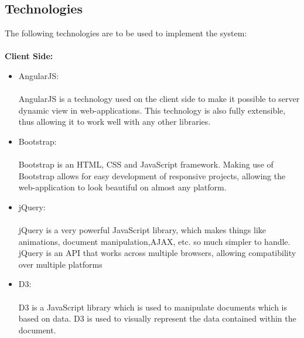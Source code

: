 \subsection{Technologies}
The following technologies are to be used to implement the system:\\ \\
{\bfseries Client Side:}
\begin{itemize}
	\item AngularJS: \\ \\
	AngularJS is a technology used on the client side to make it possible to server dynamic view in web-applications. This technology is also fully extensible, thus allowing it to work well with any other libraries.
	\item Bootstrap: \\ \\
	Bootstrap is an HTML, CSS and JavaScript framework. Making use of Bootstrap allows for easy development of responsive projects, allowing the web-application to look beautiful on almost any platform.
	\item jQuery: \\ \\
	jQuery is a very powerful JavaScript library, which makes things like animations, document manipulation,AJAX, etc. so much simpler to handle. jQuery is an API that works across multiple browsers, allowing compatibility over multiple platforms
	\item D3: \\ \\
	D3 is a JavaScript library which is used to manipulate documents which is based on data. D3 is used to visually represent the data contained within the document.
\end{itemize}

